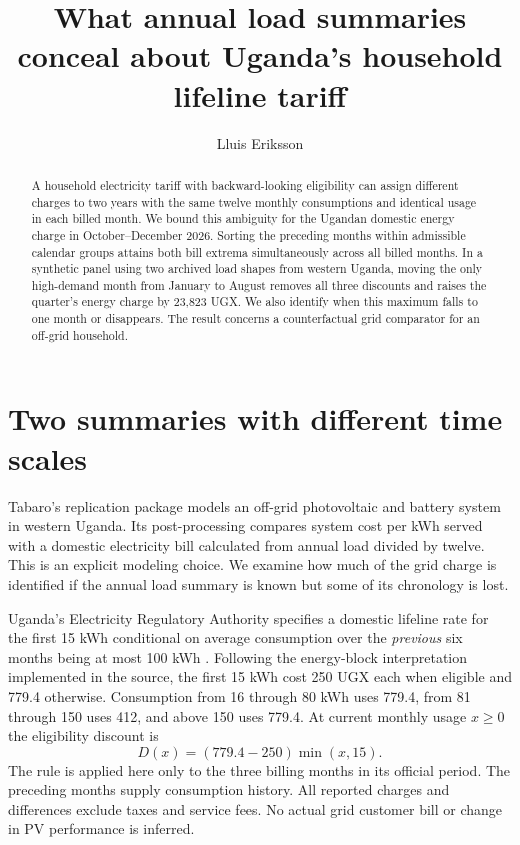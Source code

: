\documentclass[11pt]{article}
\title{What annual load summaries conceal about Uganda's household lifeline tariff}
\author{Lluis Eriksson}
\date{}
\begin{document}
\maketitle
\begin{abstract}
A household electricity tariff with backward-looking eligibility can assign different charges to two years with the same twelve monthly consumptions and identical usage in each billed month. We bound this ambiguity for the Ugandan domestic energy charge in October--December 2026. Sorting the preceding months within admissible calendar groups attains both bill extrema simultaneously across all billed months. In a synthetic panel using two archived load shapes from western Uganda, moving the only high-demand month from January to August removes all three discounts and raises the quarter's energy charge by 23,823 UGX. We also identify when this maximum falls to one month or disappears. The result concerns a counterfactual grid comparator for an off-grid household.
\end{abstract}

\section{Two summaries with different time scales}
Tabaro's replication package \cite{tabaro} models an off-grid photovoltaic and battery system in western Uganda. Its post-processing compares system cost per kWh served with a domestic electricity bill calculated from annual load divided by twelve. This is an explicit modeling choice. We examine how much of the grid charge is identified if the annual load summary is known but some of its chronology is lost.

Uganda's Electricity Regulatory Authority specifies a domestic lifeline rate for the first 15 kWh conditional on average consumption over the \emph{previous} six months being at most 100 kWh \cite{era}. Following the energy-block interpretation implemented in the source, the first 15 kWh cost 250 UGX each when eligible and 779.4 otherwise. Consumption from 16 through 80 kWh uses 779.4, from 81 through 150 uses 412, and above 150 uses 779.4. At current monthly usage $x\ge0$ the eligibility discount is
\[
 D(x)=(779.4-250)\min(x,15).
\]
The rule is applied here only to the three billing months in its official period. The preceding months supply consumption history. All reported charges and differences exclude taxes and service fees. No actual grid customer bill or change in PV performance is inferred.
\end{document}
